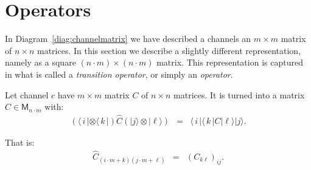 \documentclass[leqno]{tufte-book} %
\newcommand{\Mat}{\mathsf{M}}
\newcommand{\ket}[1]{\ensuremath{|#1\rangle}}
\newcommand{\bra}[1]{\langle\,#1\,|}
\begin{document}














\section{Operators}\label{sec:operator}

In Diagram~\eqref{diag:channelmatrix} we have described a channels an
$m\times m$ matrix of $n\times n$ matrices. In this section we
describe a slightly different representation, namely as a square $(n
\cdot m) \times (n\cdot m)$ matrix. This representation is captured in
what is called a \emph{transition operator}, or simply an
\emph{operator}.

Let channel $c$ have $m\times m$ matrix $C$ of $n\times n$ matrices.
It is turned into a matrix $\widehat{C} \in \Mat_{n\cdot m}$ with:
$$\begin{array}{rcl}
(\bra{i}\otimes\bra{k})\widehat{C}(\ket{j}\otimes\ket{\ell})
& = &
\bra{i}\bra{k}C\ket{\ell}\ket{j}.
\end{array}$$

\noindent That is:
$$\begin{array}{rcl}
\widehat{C}_{(i\cdot m+k)(j\cdot m+\ell)}
& = &
(C_{k\ell})_{ij}.
\end{array}$$
\end{document}
